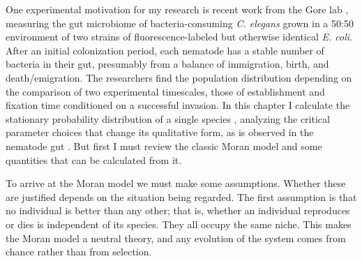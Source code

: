 One experimental motivation for my research is recent work from the Gore lab \cite{Vega2017}, measuring the gut microbiome of bacteria-consuming \emph{C. elegans} grown in a 50:50 environment of two strains of fluorescence-labeled but otherwise identical \emph{E. coli}. 
After an initial colonization period, each nematode has a stable number of bacteria in their gut, presumably from a balance of immigration, birth, and death/emigration. 
The researchers find the population distribution depending on the comparison of two experimental timescales, those of establishment and fixation time conditioned on a successful invasion. 
In this chapter I calculate the stationary probability distribution of a single species \cite{McKane2003}, analyzing the critical parameter choices that change its qualitative form, as is observed in the nematode gut \cite{Vega2017}. 
But first I must review the classic Moran model and some quantities that can be calculated from it. 


\iffalse
As a reminder, the Moran model \cite{Moran1962} is a classic urn model used in population dynamics in a variety of ways.
Its most prominent uses are in coalescent theory \cite{Kingman1982,Blythe2007,Etheridge2010} and neutral theory \cite{Kimura1956,Bell2000,Hubbell2001}, describing how the relative proportion of genes in a gene pool might change over time. 
In fact it can describe any system where individuals of different species/strains undergo strong but unselective competition in some closed or finite ecosystem \cite{Claussen2005}: applications include cancer progression \cite{Ashcroft2015}, evolutionary game theory \cite{Tayloer2004,Antal2006,Hilbe2011}, competition between species \cite{Houchmandzadeh2011,Blythe2011,Constable2015}, population dynamics with evolution \cite{Traulsen2006}, and linguistics \cite{Blythe2007}. 
\fi

\iffalse
To arrive at the Moran model we must make some assumptions.
Whether these are justified depends on the situation being regarded.
The first assumption is that no individual is better than any other; that is, whether an individual reproduces or dies is independent of its species. %
They all occupy the same niche. 
This makes the Moran model a neutral theory, and any evolution of the system comes from chance rather than from selection. 

